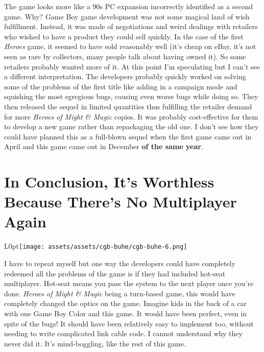 \documentclass{book}
\begin{document}
The game looks more like a 90s PC expansion incorrectly identified as a second game. Why? Game Boy game development was not some magical land of wish fulfillment. Instead, it was made of negotiations and weird dealings with retailers who wished to have a product they could sell quickly. In the case of the first \emph{Heroes} game, it seemed to have sold reasonably well (it’s cheap on eBay, it’s not seen as rare by collectors, many people talk about having owned it). So some retailers probably wanted more of it. At this point I’m speculating but I can’t see a different interpretation. The developers probably quickly worked on solving some of the problems of the first title like adding in a campaign mode and squishing the most egregious bugs, causing even worse bugs while doing so. They then released the sequel in limited quantities thus fulfilling the retailer demand for more \emph{Heroes of Might \& Magic} copies. It was probably cost-effective for them to develop a new game rather than repackaging the old one. I don’t see how they could have planned this as a full-blown sequel when the first game came out in April and this game came out in December \textbf{of the same year}.\par
\FloatBarrier\section*{In Conclusion, It’s Worthless Because There’s No Multiplayer Again}
\begin{wrapfigure}{L}{0pt}{\texttt{[image: assets/assets/cgb-buhe/cgb-buhe-6.png]}}\end{wrapfigure}\noindent
I have to repeat myself but one way the developers could have completely redeemed all the problems of the game is if they had included hot-seat multiplayer. Hot-seat means you pass the system to the next player once you’re done. \emph{Heroes of Might \& Magic} being a turn-based game, this would have completely changed the optics on the game. Imagine kids in the back of a car with one Game Boy Color and this game. It would have been perfect, even in spite of the bugs! It should have been relatively easy to implement too, without needing to write complicated link cable code. I cannot understand why they never did it. It’s mind-boggling, like the rest of this game.\par
\end{document}
